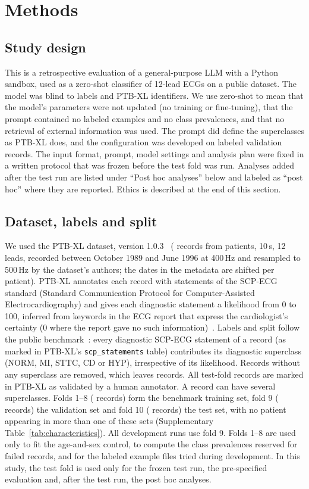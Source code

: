 \section{Methods}\label{sec:methods}

\subsection{Study design}
This is a retrospective evaluation of a general-purpose LLM with a Python sandbox, used as a zero-shot classifier of
12-lead ECGs on a public dataset. The model was blind to labels and PTB-XL identifiers. We use zero-shot to mean that
the model's parameters were not updated (no training or fine-tuning), that the prompt contained no labeled examples
and no class prevalences, and that no retrieval of external information was used. The prompt did define the superclasses as PTB-XL does, and
the configuration was developed on labeled validation records. The input format,
prompt, model settings and analysis plan were fixed in a written protocol that was frozen before the test fold was
run. Analyses added after the test run are listed under ``Post hoc analyses'' below and labeled as ``post hoc'' where they
are reported. Ethics is described at the end of this section.

\subsection{Dataset, labels and split}
We used the PTB-XL dataset, version 1.0.3~\citep{Wagner2020,Wagner2022physionet} (\NRecordsTotal{} records from \NPatients{}
patients, 10\,s, 12 leads, recorded between October 1989 and June 1996 at 400\,Hz and resampled to 500\,Hz by the
dataset's authors; the dates in the metadata are shifted per patient). PTB-XL annotates each record with statements
of the SCP-ECG standard (Standard Communication Protocol for Computer-Assisted Electrocardiography) and gives each
diagnostic statement a likelihood from 0 to 100, inferred from keywords in the ECG report that express the
cardiologist's certainty (0 where the report gave no such information)~\citep{Wagner2020}. Labels and split follow the
public benchmark~\citep{Strodthoff2021}: every diagnostic SCP-ECG statement of a record (as marked in PTB-XL's
\texttt{scp\_statements} table) contributes its diagnostic superclass (NORM, MI, STTC, CD or HYP), irrespective of its
likelihood. Records without any superclass are removed, which leaves \NWithSuperclass{} records. All test-fold records
are marked in PTB-XL as validated by a human annotator. A record can have several superclasses. Folds 1--8
(\NTrain{} records) form the benchmark training set, fold 9 (\NVal{} records) the validation set and fold 10
(\NTest{} records) the test set, with no patient appearing in more than one of these sets (Supplementary
Table~\ref{tab:characteristics}). All development runs use fold 9. Folds 1--8 are used only to fit the age-and-sex
control, to compute the class prevalences reserved for failed records, and for the labeled example files tried
during development. In this study, the test fold is used only for the frozen test run, the pre-specified evaluation
and, after the test run, the post hoc analyses.

